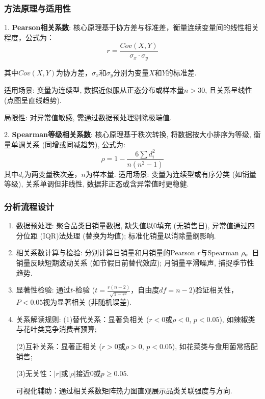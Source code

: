 \documentclass{cumcmthesis}
\begin{document}
\subsubsection{方法原理与适用性}
1. \textbf{Pearson相关系数}:   
核心原理基于协方差与标准差，衡量连续变量间的线性相关程度，公式为：  
\begin{equation}
r=\frac{Cov(X,Y)}{\sigma_x \cdot \sigma_y}
\end{equation}  

其中$Cov(X,Y)$为协方差，$\sigma_x$和$\sigma_y$分别为变量$X$和$Y$的标准差.  

适用场景: 变量为连续型, 数据近似服从正态分布或样本量$n>30$, 且关系呈线性 (点图呈直线趋势). 

局限性: 对异常值敏感, 需通过数据预处理剔除极端值. 

2. \textbf{Spearman等级相关系数}:   
核心原理基于秩次转换, 将数据按大小排序为等级, 衡量单调关系 (同增或同减趋势), 公式为: 
\begin{equation}
\rho=1-\frac{6\sum d_i^2}{n(n^2-1)}
\end{equation}  
其中$d_i$为两变量秩次差，$n$为样本量.  
适用场景: 变量为连续型或有序分类 (如销量等级), 关系单调但非线性, 数据非正态或含异常值时更稳健.

\subsubsection{分析流程设计}
\begin{enumerate}
    \item 数据预处理: 聚合品类日销量数据, 缺失值以0填充 (无销售日), 异常值通过四分位距 (IQR)法处理 (替换为均值); 标准化销量以消除量纲影响. 
    \item 相关系数计算与检验: 分别计算日销量和月销量的Pearson $r$与Spearman $\rho$。日销量反映短期波动关系 (如节假日前替代效应); 月销量平滑噪声, 捕捉季节性趋势. 
    \item 显著性检验: 通过$t$-检验 ($t=\frac{r(n-2)}{\sqrt{1-r^2}}$，自由度$df=n-2$)验证相关性，$P<0.05$视为显著相关 (非随机误差). 
    \item 关系解读规则: 
    (1)替代关系：显著负相关 ($r<0$或$\rho<0$, $p<0.05$), 如辣椒类与花叶类竞争消费者预算; 

    (2)互补关系：显著正相关 ($r>0$或$\rho>0$, $p<0.05$), 如花菜类与食用菌常搭配销售;  

    (3)无关性：$|r|$或$|\rho|$接近0或$p≥0.05$.

    可视化辅助：通过相关系数矩阵热力图直观展示品类关联强度与方向. 
\end{enumerate}
\end{document}
